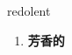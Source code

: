 
\begin{frame}
{\huge redolent}
\begin{center}
\begin{enumerate}\Large
  \item \textbf{芳香的}
\end{enumerate}
\end{center}
\end{frame}
